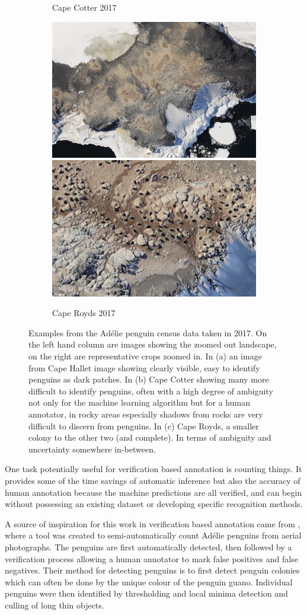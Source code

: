 \begin{figure}[ht!]
\begin{subfigure}[t]{1.0\linewidth}
  \caption{Cape Cotter 2017}
\end{subfigure}
\begin{subfigure}[t]{1.0\linewidth}
  \includegraphics[width=0.475\linewidth]{figures/annotation/penguin/royds_large.jpg}
  \hfill
  \includegraphics[width=0.475\linewidth]{figures/annotation/penguin/royds.jpg}
  \caption{Cape Royds 2017}
\end{subfigure}

\caption{Examples from the Ad\'elie penguin census data taken in 2017. On the left hand column are images showing the zoomed out landscape, on the right are representative crops zoomed in.  In (a) an image from Cape Hallet image showing clearly visible, easy to identify penguins as dark patches. In (b) Cape Cotter showing many more difficult to identify penguins, often with a high degree of ambiguity not only for the machine learning algorithm but for a human annotator, in rocky areas especially shadows from rocks are very difficult to discern from penguins. In (c) Cape Royds, a smaller colony to the other two (and complete). In terms of ambiguity and uncertainty somewhere in-between. }
\label {fig:penguin_examples}
\end{figure}


One task potentially useful for verification based annotation is counting things. It provides some of the time savings of automatic inference but also the accuracy of human annotation because the machine predictions are all verified, and can begin without possessing an existing dataset or developing specific recognition methods. 

A source of inspiration for this work in verification based annotation came from \cite{McNeill2011}, where a tool was created to semi-automatically count Ad\'elie penguins from aerial photographs. The penguins are first automatically detected, then followed by a verification process allowing a human annotator to mark false positives and false negatives. Their method for detecting penguins is to first detect penguin colonies which can often be done by the unique colour of the penguin guano. Individual penguins were then identified by thresholding and local minima detection and culling of long thin objects. 

